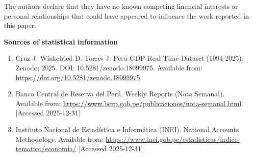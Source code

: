 \documentclass[12pt]{article}
\begin{document}

The authors declare that they have no known competing financial interests or personal relationships that could have appeared to influence the work reported in this paper.



\small


\normalsize

\textbf{Sources of statistical information}

\begin{enumerate}

    \item Cruz J, Winkelried D, Torres J. Peru GDP Real-Time Dataset (1994-2025). Zenodo; 2025. DOI: 10.5281/zenodo.18099975. Available from: \url{https://doi.org/10.5281/zenodo.18099975}
    
    \item Banco Central de Reserva del Perú. Weekly Reports (Nota Semanal). Available from: \url{https://www.bcrp.gob.pe/publicaciones/nota-semanal.html} [Accessed 2025-12-31]
    
    \item Instituto Nacional de Estadística e Informática (INEI). National Accounts Methodology. Available from: \url{https://www.inei.gob.pe/estadisticas/indice-tematico/economia/} [Accessed 2025-12-31]
    
\end{enumerate}
\end{document}
